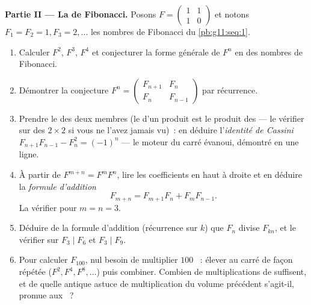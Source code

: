 \begin{problem}
\medskip
\noindent\textbf{Partie II --- La  de Fibonacci.}
Posons $F = \begin{pmatrix} 1 & 1\\ 1 & 0\end{pmatrix}$ et notons
$F_1 = F_2 = 1, F_3 = 2, \dots$ les nombres de Fibonacci du
\cref{pb:g11:seq:1}.
\begin{enumerate}[resume]
  \item Calculer $F^2$, $F^3$, $F^4$ et conjecturer la forme
        générale de $F^n$ en  des nombres de Fibonacci.
  \item Démontrer la conjecture
        $F^n = \begin{pmatrix} F_{n+1} & F_n\\ F_n & F_{n-1}
        \end{pmatrix}$ par récurrence.
  \item Prendre le  des deux membres (le 
        d'un produit est le produit des  --- le
        vérifier sur des  $2 \times 2$ si vous ne l'avez
        jamais vu)~: en déduire l'\emph{identité de Cassini}
        $F_{n+1}F_{n-1} - F_n^2 = (-1)^n$ --- le moteur du carré
        évanoui, démontré en une ligne.
  \item À partir de $F^{m+n} = F^m F^n$, lire les coefficients en
        haut à droite et en déduire la \emph{formule d'addition}
        \[
        F_{m+n} = F_{m+1} F_n + F_m F_{n-1} .
        \]
        La vérifier pour $m = n = 3$.
  \item Déduire de la formule d'addition (récurrence sur $k$) que
        $F_n$ divise $F_{kn}$, et le vérifier sur $F_3 \mid F_6$ et
        $F_3 \mid F_9$.
  \item Pour calculer $F_{100}$, nul besoin de multiplier $100$
        ~: élever au carré de façon répétée
        ($F^2, F^4, F^8, \dots$) puis combiner. Combien de
        multiplications de  suffisent, et de quelle antique
        astuce de multiplication du volume précédent s'agit-il,
        promue aux ~?
\end{enumerate}


\end{problem}
